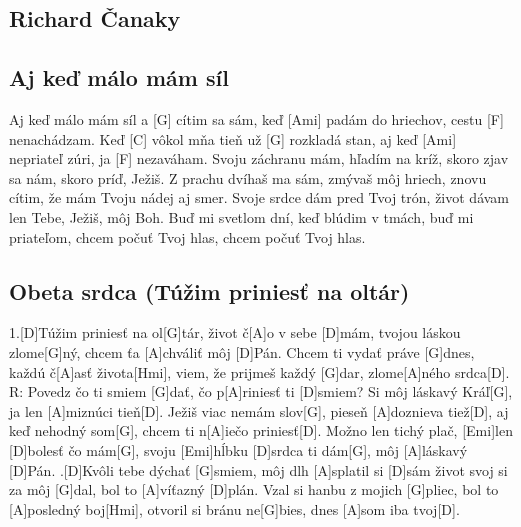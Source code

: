 \documentclass[10pt]{article}
\begin{document}
\begin{Large}
\newpage

\begin{minipage}{\textwidth}
\section{Richard Čanaky}
\subsection{Aj keď málo mám síl}
\begin{multicols*}{3}
\begin{guitar}
	[C] Aj keď málo mám síl 
	a [G] cítim sa sám,
	keď [Ami] padám do hriechov, 
	cestu [F] nenachádzam.
	Keď [C] vôkol mňa tieň 
	už [G] rozkladá stan,
	aj keď [Ami] nepriateľ zúri, 
	ja [F] nezaváham.
	\columnbreak
	Svoju záchranu mám, 
	hľadím na kríž,
	skoro zjav sa nám, 
	skoro príď, Ježiš.
	Z prachu dvíhaš ma sám, 
	zmývaš môj hriech,
	znovu cítim, že mám 
	Tvoju nádej aj smer.
	\columnbreak
	Svoje srdce dám pred Tvoj 
	trón,
	život dávam len Tebe, 
	Ježiš, môj Boh.
	Buď mi svetlom dní, 
	keď blúdim v tmách,
	buď mi priateľom, 
	chcem počuť Tvoj hlas,
	chcem počuť Tvoj hlas.	
\end{guitar}
\end{multicols*}
\end{minipage}

\begin{minipage}{\textwidth}
\subsection{Obeta srdca (Túžim priniesť na oltár)}
\begin{multicols*}{3}
\begin{guitar}
	1.[D]Túžim priniesť na ol[G]tár, 
	život č[A]o v sebe [D]mám,
	tvojou láskou zlome[G]ný, 
	chcem ťa [A]chváliť môj [D]Pán.
	Chcem ti vydať práve [G]dnes, 
	každú č[A]asť života[Hmi],
	viem, že prijmeš každý [G]dar, 
	zlome[A]ného srdca[D].
	\columnbreak
	R:
	Povedz čo ti smiem [G]dať, 
	čo p[A]riniesť ti [D]smiem?
	Si môj láskavý Kráľ[G], 
	ja len [A]miznúci tieň[D].
	Ježiš viac nemám slov[G], 
	pieseň [A]doznieva tiež[D],
	aj keď nehodný som[G], 
	chcem ti n[A]iečo priniesť[D].
	Možno len tichý plač, 
	[Emi]len [D]bolesť čo mám[G],
	svoju [Emi]hĺbku [D]srdca ti dám[G], 
	môj [A]láskavý [D]Pán.
	.[D]Kvôli tebe dýchať [G]smiem, 
	môj dlh [A]splatil si [D]sám
	život svoj si za môj [G]dal, 
	bol to [A]víťazný [D]plán.
	Vzal si hanbu z mojich [G]pliec, 
	bol to [A]posledný boj[Hmi], 
	otvoril si bránu ne[G]bies, 
	dnes [A]som iba tvoj[D].
\end{guitar}
\end{multicols*}
\end{minipage}


\end{Large}
\end{document}
